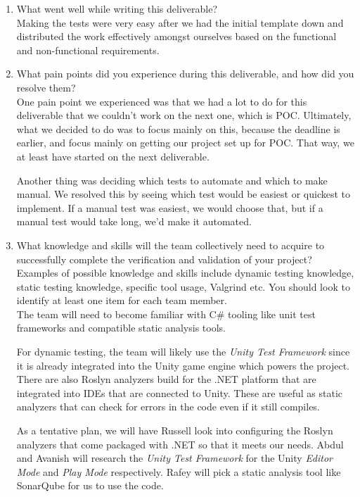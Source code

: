 \documentclass[12pt, titlepage]{article}
\begin{document}
\begin{enumerate}
  \item What went well while writing this deliverable? \\

        Making the tests were very easy after we had the initial template down and distributed the work effectively amongst ourselves based on the functional and non-functional requirements.

  \item What pain points did you experience during this deliverable, and how did you resolve them?\\

        One pain point we experienced was that we had a lot to do for this deliverable that we couldn't work on the next one, which is POC. Ultimately, what we decided to do was to focus mainly on this, because the deadline is earlier, and focus mainly on getting our project set up for POC. That way, we at least have started on the next deliverable.

        Another thing was deciding which tests to automate and which to make manual. We resolved this by seeing which test would be easiest or quickest to implement. If a manual test was easiest, we would choose that, but if a manual test would take long, we'd make it automated.\\

  \item What knowledge and skills will the team collectively need to acquire to successfully complete the verification and validation of your project? Examples of possible knowledge and skills include dynamic testing knowledge, static testing knowledge, specific tool usage, Valgrind etc. You should look to identify at least one item for each team member.\\

        The team will need to become familiar with C\# tooling like unit test frameworks and compatible static analysis tools.

        For dynamic testing, the team will likely use the \textit{Unity Test Framework} since it is already integrated into the Unity game engine which powers the project. There are also Roslyn analyzers build for the .NET platform that are integrated into IDEs that are connected to Unity. These are useful as static analyzers that can check for errors in the code even if it still compiles.

        As a tentative plan, we will have Russell look into configuring the Roslyn analyzers that come packaged with .NET so that it meets our needs. Abdul and Avanish will research the \textit{Unity Test Framework} for the Unity \textit{Editor Mode} and \textit{Play Mode} respectively. Rafey will pick a static analysis tool like SonarQube for us to use the code.


\end{enumerate}
\end{document}
